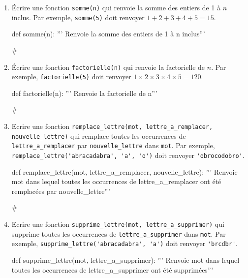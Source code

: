 	\begin{exercice_cours}[Boucle FOR]

		\begin{enumerate}
			\item Écrire une fonction \verb|somme(n)| qui renvoie la somme des entiers de 1 à $n$ inclus. Par exemple, \verb|somme(5)| doit renvoyer $1+2+3+4+5=15$.
			
			\begin{CodePythontexAlt}[Largeur=1\linewidth,Centre,PremLigne=1,Lignes=false,]{}
				def somme(n):
					''' Renvoie la somme des entiers de 1 à n inclus'''
					
					

					
					
				#
				\end{CodePythontexAlt}

			\item Écrire une fonction \verb|factorielle(n)| qui renvoie la factorielle de $n$. Par exemple, \verb|factorielle(5)| doit renvoyer $1\times2\times3\times4\times5=120$.
			
			\begin{CodePythontexAlt}[Largeur=1\linewidth,Centre,PremLigne=1,Lignes=false,]{}
				def factorielle(n):
					''' Renvoie la factorielle de n'''
					
					
					

					
				#
				\end{CodePythontexAlt}
			\item Ecrire une fonction \verb|remplace_lettre(mot, lettre_a_remplacer, nouvelle_lettre)| qui remplace toutes les occurrences de \verb|lettre_a_remplacer| par \verb|nouvelle_lettre| dans \verb|mot|. Par exemple, \verb|remplace_lettre('abracadabra', 'a', 'o')| doit renvoyer \verb+'obrocodobro'+.
			\begin{CodePythontexAlt}[Largeur=1\linewidth,Centre,PremLigne=1,Lignes=false,]{}
				def remplace_lettre(mot, lettre_a_remplacer, nouvelle_lettre):
					''' Renvoie mot dans lequel toutes les occurrences de 
					lettre_a_remplacer ont été remplacées par nouvelle_lettre'''
					
					



					


					
				#
				\end{CodePythontexAlt}
			
			\item Ecrire une fonction \verb|supprime_lettre(mot, lettre_a_supprimer)| qui supprime toutes les occurrences de \verb|lettre_a_supprimer| dans \verb|mot|. Par exemple, \verb|supprime_lettre('abracadabra', 'a')| doit renvoyer \verb+'brcdbr'+.	
			\begin{CodePythontexAlt}[Largeur=1\linewidth,Centre,PremLigne=1,Lignes=false,]{}
				def supprime_lettre(mot, lettre_a_supprimer):
					''' Renvoie mot dans lequel toutes les occurrences de 
					lettre_a_supprimer ont été supprimées'''
					



\end{CodePythontexAlt}
\end{enumerate}
\end{exercice_cours}
